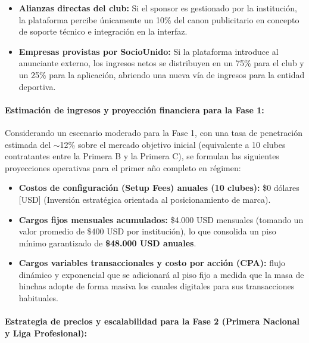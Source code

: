 \begin{enumerate}
    \begin{itemize}
        \item \textbf{Alianzas directas del club:} Si el sponsor es gestionado por la institución, la plataforma percibe únicamente un 10\% del canon publicitario en concepto de soporte técnico e integración en la interfaz.
        \item \textbf{Empresas provistas por SocioUnido:} Si la plataforma introduce al anunciante externo, los ingresos netos se distribuyen en un 75\% para el club y un 25\% para la aplicación, abriendo una nueva vía de ingresos para la entidad deportiva.
    \end{itemize}
\end{enumerate}

\newpage

\paragraph{Estimación de ingresos y proyección financiera para la Fase 1:}

Considerando un escenario moderado para la Fase 1, con una tasa de penetración estimada del $\sim$12\% sobre el mercado objetivo inicial (equivalente a 10 clubes contratantes entre la Primera B y la Primera C), se formulan las siguientes proyecciones operativas para el primer año completo en régimen:
\begin{itemize}
    \item \textbf{Costos de configuración (Setup Fees) anuales (10 clubes):} \$0 dólares [USD] (Inversión estratégica orientada al posicionamiento de marca).
    \item \textbf{Cargos fijos mensuales acumulados:} \$4.000 USD mensuales (tomando un valor promedio de \$400 USD por institución), lo que consolida un piso mínimo garantizado de \textbf{\$48.000 USD anuales}.
    \item \textbf{Cargos variables transaccionales y costo por acción (CPA):} flujo dinámico y exponencial que se adicionará al piso fijo a medida que la masa de hinchas adopte de forma masiva los canales digitales para sus transacciones habituales.
\end{itemize}

\paragraph{Estrategia de precios y escalabilidad para la Fase 2 (Primera Nacional y Liga Profesional):}

